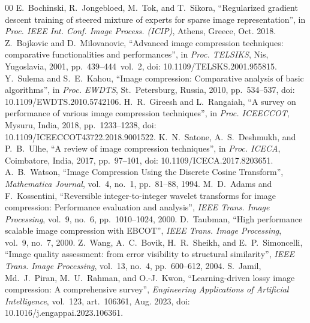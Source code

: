 \documentclass[conference]{IEEEtran}
\begin{document}
\begin{thebibliography}{00}
 E.~Bochinski, R.~Jongebloed, M.~Tok, and T.~Sikora, ``Regularized gradient descent training of steered mixture of experts for sparse image representation'', in \emph{Proc. IEEE Int. Conf. Image Process. (ICIP)}, Athens, Greece, Oct. 2018.
 Z.~Bojkovic and D.~Milovanovic, ``Advanced image compression techniques: comparative functionalities and performances'', in \emph{Proc. TELSIKS}, Nis, Yugoslavia, 2001, pp.~439--444~vol.~2, doi: 10.1109/TELSKS.2001.955815.
 Y.~Sulema and S.~E.~Kahou, ``Image compression: Comparative analysis of basic algorithms'', in \emph{Proc. EWDTS}, St.~Petersburg, Russia, 2010, pp.~534--537, doi: 10.1109/EWDTS.2010.5742106.
 H.~R.~Gireesh and L.~Rangaiah, ``A survey on performance of various image compression techniques'', in \emph{Proc. ICEECCOT}, Mysuru, India, 2018, pp.~1233--1238, doi: 10.1109/ICEECCOT43722.2018.9001522.
 K.~N.~Satone, A.~S.~Deshmukh, and P.~B.~Ulhe, ``A review of image compression techniques'', in \emph{Proc. ICECA}, Coimbatore, India, 2017, pp.~97--101, doi: 10.1109/ICECA.2017.8203651.
 A.~B.~Watson, ``Image Compression Using the Discrete Cosine Transform'', \emph{Mathematica Journal}, vol.~4, no.~1, pp.~81--88, 1994.
 M.~D.~Adams and F.~Kossentini, ``Reversible integer-to-integer wavelet transforms for image compression: Performance evaluation and analysis'', \emph{IEEE Trans. Image Processing}, vol.~9, no.~6, pp.~1010--1024, 2000.
 D.~Taubman, ``High performance scalable image compression with EBCOT'', \emph{IEEE Trans. Image Processing}, vol.~9, no.~7, 2000.
 Z.~Wang, A.~C.~Bovik, H.~R.~Sheikh, and E.~P.~Simoncelli, ``Image quality assessment: from error visibility to structural similarity'', \emph{IEEE Trans. Image Processing}, vol.~13, no.~4, pp.~600--612, 2004.
 S.~Jamil, Md.~J.~Piran, M.~U.~Rahman, and O.-J.~Kwon, ``Learning-driven lossy image compression: A comprehensive survey'', \emph{Engineering Applications of Artificial Intelligence}, vol.~123, art.~106361, Aug. 2023, doi: 10.1016/j.engappai.2023.106361.
\end{thebibliography}
\end{document}
